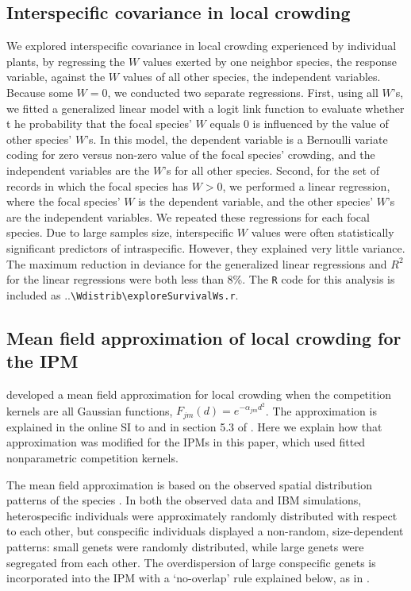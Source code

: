 \documentclass[11pt]{article}
\begin{document}
\subsection{Interspecific covariance in local crowding} 
We explored interspecific covariance in local crowding experienced by individual plants, by regressing the $W$ values exerted by one neighbor species,
 the response variable, against the $W$ values of all other species, the independent variables. Because some $W=0$, we conducted two 
 separate regressions. First, using all $W$'s, we fitted a generalized linear model with a logit link function to evaluate whether t
 he probability that the focal species' $W$ equals 0 is influenced by the value of other species' $W$'s. In this model, the dependent 
 variable is a Bernoulli variate coding for zero versus non-zero value of the focal species' crowding, and the independent 
 variables are the $W$'s for all other species. Second, for the set of records in which the focal species has $W>0$, we 
 performed a linear regression, where the focal species' $W$ is the dependent variable, and the other species' $W$'s are 
 the independent variables. We repeated these regressions for each focal species. Due to large samples size, interspecific $W$ 
 values were often statistically significant predictors of intraspecific. However, they explained very little variance. The 
 maximum reduction in deviance for the generalized linear regressions and $R^2$ for the linear regressions were both less 
 than 8\%. The \texttt{R} code for this analysis is included as ..\texttt{\textbackslash Wdistrib\textbackslash exploreSurvivalWs.r}.

\subsection{Mean field approximation of local crowding for the IPM} 
\label{sec:kernelMethods} 
\citet{adler_coexistence_2010} developed a mean field approximation for local crowding when the
competition kernels are all Gaussian functions, $F_{jm}(d) = e^{-\alpha_{jm} d^2}$. The approximation is explained in 
the online SI to \citet{adler_coexistence_2010} and in section 5.3 of \citet{Ellner2016}. 
Here we explain how that approximation was modified for the IPMs in this paper, which
used fitted nonparametric competition kernels. 

The mean field approximation is based on the observed spatial distribution patterns of the species \citep{adler_coexistence_2010}. 
In both the observed data and IBM simulations, heterospecific individuals were approximately randomly distributed with respect to each other, 
but conspecific individuals displayed a non-random, size-dependent patterns: small genets were randomly distributed, while large genets 
were segregated from each other. The overdispersion of large conspecific genets is incorporated into the IPM 
with a `no-overlap' rule explained below, as in \citep{adler_coexistence_2010}.
\end{document}
